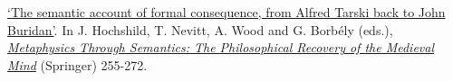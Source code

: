 \item {}
{}
{
	\href{https://www.academia.edu/29440650/The_semantic_account_of_formal_consequence_from_Alfred_Tarski_back_to_John_Buridan}{`The semantic account of formal consequence, from Alfred Tarski back to John Buridan'}. In J. Hochshild, T. Nevitt, A. Wood and G. Borb\'{e}ly (eds.), \href{https://link.springer.com/chapter/10.1007/978-3-031-15026-5_15}{\emph{Metaphysics Through Semantics: The Philosophical Recovery of the Medieval Mind}} (Springer) 255-272.}
{}
